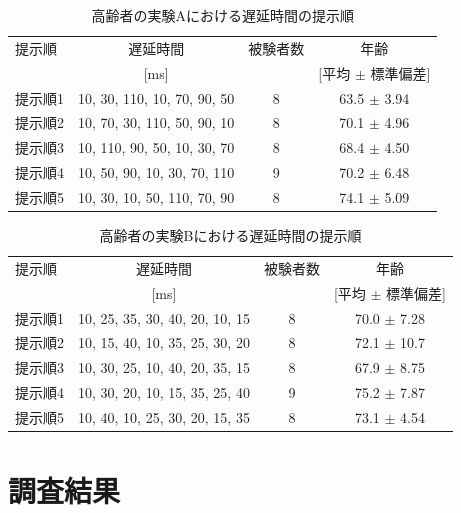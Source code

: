 \begin{table}[btp]
  \caption{高齢者の実験Aにおける遅延時間の提示順}
  \label{table:old_a}
  \centering
  \begin{tabular}{lccc}
    \hline
    提示順 & 遅延時間 & 被験者数 & 年齢\\
    　& [ms] & & [平均 $\pm$ 標準偏差]\\
    \hline \hline
    提示順1  & 10, 30, 110, 10, 70, 90, 50  & 8 & 63.5 $\pm$ 3.94\\
    提示順2  & 10, 70, 30, 110, 50, 90, 10  & 8 & 70.1 $\pm$ 4.96\\
    提示順3  & 10, 110, 90, 50, 10, 30, 70  & 8 & 68.4 $\pm$ 4.50\\
    提示順4  & 10, 50, 90, 10, 30, 70, 110  & 9 & 70.2 $\pm$ 6.48\\
    提示順5  & 10, 30, 10, 50, 110, 70, 90  & 8 & 74.1 $\pm$ 5.09
\\
    \hline
  \end{tabular}
\end{table}
\begin{table}[btp]
  \caption{高齢者の実験Bにおける遅延時間の提示順}
  \label{table:old_b}
  \centering
  \begin{tabular}{lccc}
    \hline
    提示順 & 遅延時間 & 被験者数 & 年齢\\
    　& [ms] & & [平均 $\pm$ 標準偏差]\\
    \hline \hline
    提示順1  & 10, 25, 35, 30, 40, 20, 10, 15  & 8 & 70.0 $\pm$ 7.28\\
    提示順2  & 10, 15, 40, 10, 35, 25, 30, 20  & 8 & 72.1 $\pm$ 10.7\\
    提示順3  & 10, 30, 25, 10, 40, 20, 35, 15  & 8 & 67.9 $\pm$ 8.75\\
    提示順4  & 10, 30, 20, 10, 15, 35, 25, 40  & 9 & 75.2 $\pm$ 7.87\\
    提示順5  & 10, 40, 10, 25, 30, 20, 15, 35  & 8 & 73.1 $\pm$ 4.54
\\
    \hline
  \end{tabular}
\end{table}
\newpage
\section{調査結果}
